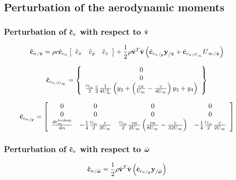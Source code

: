 \subsection{Perturbation of the aerodynamic moments}
\subsubsection{Perturbation of $\bm{\mathbf{\tilde{c}}}_a$ with respect to $\tilde{\bm{\mathbf{v}}}$}
		
\begin{equation}
{\bm{\mathbf{\tilde{c}}}_a}_{/\tilde{\bm{\mathbf{v}}}} = 
	\rho c \tilde{\bm{\mathbf{c}}}_{c_{a}} \left[
		\begin{array}{ccc}
			\tilde{v}_x & \tilde{v}_y & \tilde{v}_z
		\end{array} \right] +
	\frac{1}{2} \rho \tilde{\bm{\mathbf{v}}}^T \tilde{\bm{\mathbf{v}}} 
	\left(  \tilde{\bm{\mathbf{c}}}_{{c_{a}}_{/\bm{\mathbf{y}}}} \bm{\mathbf{y}}_{/\tilde{\bm{\mathbf{v}}}} + 
	\tilde{\bm{\mathbf{c}}}_{{c_{a}}_{/U_{\infty}}} {U_\infty}_{/\tilde{\bm{\mathbf{v}}}}  \right) 
\end{equation}

\begin{equation}
\tilde{\bm{\mathbf{c}}}_{{c_{a}}_{/U_{\infty}}} = \left\{
	\begin{array}{c}
		0 \\
		0 \\
		\frac{c_{l_{\alpha}}}{2} \frac{c}{2} \frac{1}{4 U_\infty^2} 
		\left(  y_2 + \left(  \frac{c a}{U_\infty} - \frac{c}{4 U_\infty}  \right) y_3 +y_4 \right)
	\end{array} \right\}
\end{equation}

\begin{equation}
\tilde{\bm{\mathbf{c}}}_{{c_{a}}_{/\bm{\mathbf{y}}}} = \left[
	\begin{array}{cccc}
		0 & 0 & 0 & 0 \\
		0 & 0 & 0 & 0 \\
		\frac{ d c_m^{\text{lookup}}}{d \alpha} & 
			-\frac{1}{4} \frac{c_{l_{\alpha}}}{2} \frac{c}{2 U_\infty} &
			\frac{c_{l_{\alpha}}}{2} \frac{ c a}{2 U_\infty} \left(  \frac{c a}{8 U_\infty} -\frac{c}{32 U_\infty} \right) &
			-\frac{1}{4} \frac{c_{l_{\alpha}}}{2} \frac{c}{2 U_\infty} 
	\end{array} \right]
\end{equation}
\subsubsection{Perturbation of $\bm{\mathbf{\tilde{c}}}_a$ with respect to $\tilde{\bm{\mathbf{\omega}}}$}
\begin{equation}
{\bm{\mathbf{\tilde{c}}}_a}_{/\tilde{\bm{\mathbf{\omega}}}} = 
	\frac{1}{2} \rho \tilde{\bm{\mathbf{v}}}^T \tilde{\bm{\mathbf{v}}} 
	\left(  \tilde{\bm{\mathbf{c}}}_{{c_{a}}_{/\bm{\mathbf{y}}}} \bm{\mathbf{y}}_{/\tilde{\bm{\mathbf{\omega}}}}  \right) 
\end{equation}
